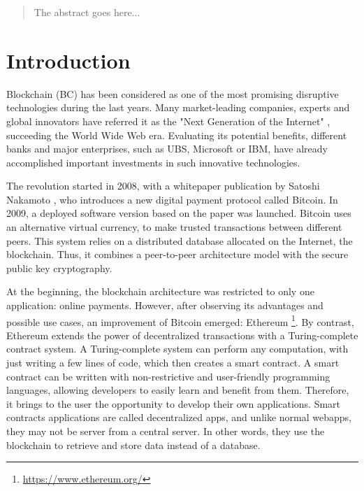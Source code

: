 \begin{abstract}
 The abstract goes here... 
\end{abstract}




\chapter{Introduction}

Blockchain (BC) has been considered as one of the most promising disruptive technologies during the last years. Many market-leading companies, experts and global innovators have referred it as the "Next Generation of the Internet" \cite{JenClarck2017}, succeeding the World Wide Web era. Evaluating its potential benefits, different banks and major enterprises, such as UBS, Microsoft or IBM, have already accomplished important investments in such innovative technologies.

The revolution started in 2008, with a whitepaper publication by Satoshi Nakamoto \cite{nakamoto2008bitcoin}, who introduces a new digital payment protocol called Bitcoin. In 2009, a deployed software version based on the paper was launched. Bitcoin uses an alternative virtual currency, to make trusted transactions between different peers. This system relies on a distributed database allocated on the Internet, the blockchain. Thus, it combines a peer-to-peer architecture model with the secure public key cryptography. 

At the beginning, the blockchain architecture was restricted to only one application: online payments. However, after observing its advantages and possible use cases, an improvement of Bitcoin emerged: Ethereum \footnote{\url{https://www.ethereum.org/}}. By contrast, Ethereum extends the power of decentralized transactions with a Turing-complete contract system. A Turing-complete system can perform any computation, with just writing a few lines of code, which then creates a smart contract. A smart contract can be written with non-restrictive and user-friendly programming languages, allowing developers to easily learn and benefit from them. Therefore, it brings to the user the opportunity to develop their own applications. Smart contracts applications are called decentralized apps, and unlike normal webapps, they may not be server from a central server. In other words, they use the blockchain to retrieve and store data instead of a database.


